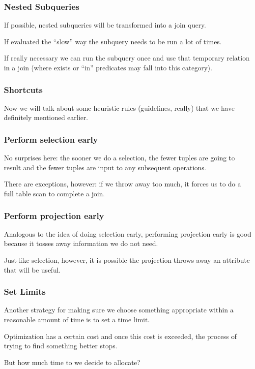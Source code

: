 \begin{frame}
\frametitle{Nested Subqueries}

If possible, nested subqueries will be transformed into a join query. 

If evaluated the ``slow'' way the subquery needs to be run a lot of times. 


If really necessary we can run the subquery once and use that temporary relation in a join (where exists or ``in'' predicates may fall into this category).


\end{frame}

\begin{frame}
\frametitle{Shortcuts}

Now we will talk about some heuristic rules (guidelines, really) that we have definitely mentioned earlier.


\end{frame}

\begin{frame}
\frametitle{Perform selection early}

No surprises here: the sooner we do a selection, the fewer tuples are going to result and the fewer tuples are input to any subsequent operations. 


There are exceptions, however: if we throw away too much, it forces us to do a full table scan to complete a join. 


\end{frame}

\begin{frame}
\frametitle{Perform projection early}

Analogous to the idea of doing selection early, performing projection early is good because it tosses away information we do not need.

Just like selection, however, it is possible the projection throws away an attribute that will be useful.


\end{frame}

\begin{frame}
\frametitle{Set Limits}

Another strategy for making sure we choose something appropriate within a reasonable amount of time is to set a time limit. 

Optimization has a certain cost and once this cost is exceeded, the process of trying to find something better stops. 

But how much time to we decide to allocate? 


\end{frame}


